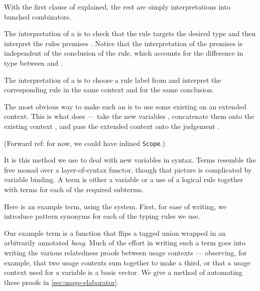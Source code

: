 With the first clause of  explained,
the rest are simply interpretations into bunched combinators.


The interpretation of a  is to check that the rule targets
the desired type and then interpret the rules premises .
Notice that the interpretation of the premises is independent of the conclusion
of the rule, which accounts for the difference in type between
 and
.


The interpretation of a  is to choose a rule label
 from  and interpret the corresponding rule
\AgdaSpace{} in the same context and for the same
conclusion.


The most obvious way to make such an  is to use some existing
 on an extended context.
This is what  does --- take the new variables
\AgdaBound{$\Delta$}, concatenate them onto the existing context
\AgdaBound{$\Gamma$}, and pass the extended context onto the judgement
.


{\color{red}(Forward ref: for now, we could have inlined \texttt{Scope}.)}

It is this method we use to deal with new variables in syntax.
Terms resemble the free monad over a layer-of-syntax functor, though that
picture is complicated by variable binding.
A term is either a variable or a use of a logical rule together with terms
for each of the required subterms.


Here is an example term, using the  system.
First, for ease of writing, we introduce pattern synonyms for each of the
typing rules we use.


Our example term is a function that flips a tagged union wrapped in an
arbitrarily annotated \emph{bang}.
Much of the effort in writing such a term goes into writing the various
relatedness proofs between usage contexts --- observing, for example, that two
usage contexts sum together to make a third, or that a usage context used for
a variable is a basis vector.
We give a method of automating these proofs in \cref{sec:usage-elaborator}.

